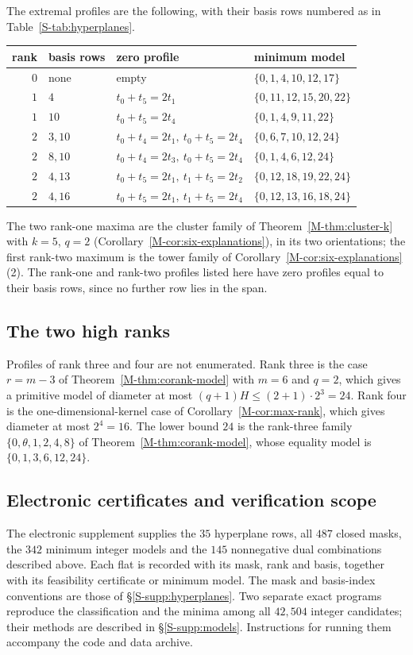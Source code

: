 \documentclass[11pt,reqno]{amsart}
\theoremstyle{plain}
\theoremstyle{definition}
\theoremstyle{plain}
\theoremstyle{plain}
\theoremstyle{plain}
\theoremstyle{plain}
\theoremstyle{plain}
\theoremstyle{plain}
\theoremstyle{definition}
\theoremstyle{definition}
\theoremstyle{definition}
\theoremstyle{plain}
\begin{document}
The extremal profiles are the following, with their basis rows numbered as
in Table~\ref{S-tab:hyperplanes}.
\begin{center}\small
\begin{tabular}{@{}rlll@{}}
\toprule
rank & basis rows & zero profile & minimum model\\
\midrule
$0$ & none & empty & $\{0,1,4,10,12,17\}$\\
$1$ & $4$ & $t_0+t_5=2t_1$ & $\{0,11,12,15,20,22\}$\\
$1$ & $10$ & $t_0+t_5=2t_4$ & $\{0,1,4,9,11,22\}$\\
$2$ & $3,10$ & $t_0+t_4=2t_1,\ t_0+t_5=2t_4$ & $\{0,6,7,10,12,24\}$\\
$2$ & $8,10$ & $t_0+t_4=2t_3,\ t_0+t_5=2t_4$ & $\{0,1,4,6,12,24\}$\\
$2$ & $4,13$ & $t_0+t_5=2t_1,\ t_1+t_5=2t_2$ & $\{0,12,18,19,22,24\}$\\
$2$ & $4,16$ & $t_0+t_5=2t_1,\ t_1+t_5=2t_4$ & $\{0,12,13,16,18,24\}$\\
\bottomrule
\end{tabular}
\end{center}
The two rank-one maxima are the cluster family of Theorem~\ref{M-thm:cluster-k} with $k=5$,
$q=2$ (Corollary~\ref{M-cor:six-explanations}), in its two orientations; the first rank-two maximum is
the tower family of Corollary~\ref{M-cor:six-explanations}(2). The rank-one and rank-two profiles
listed here have zero profiles equal to their basis rows, since no further
row lies in the span.

\subsection{The two high ranks}\label{S-supp:high-ranks}
Profiles of rank three and four are not enumerated. Rank three is the case
$r=m-3$ of Theorem~\ref{M-thm:corank-model} with $m=6$ and $q=2$, which gives a primitive model of
diameter at most $(q+1)H\le(2+1)\cdot2^3=24$. Rank four is the
one-dimensional-kernel case of Corollary~\ref{M-cor:max-rank}, which gives diameter at most
$2^4=16$. The lower bound $24$ is the rank-three family
$\{0,\theta,1,2,4,8\}$ of Theorem~\ref{M-thm:corank-model}, whose equality model is
$\{0,1,3,6,12,24\}$.

\subsection{Electronic certificates and verification scope}
\label{S-supp:package}
The electronic supplement supplies the $35$ hyperplane rows, all $487$
closed masks, the $342$ minimum integer models and the $145$ nonnegative
dual combinations described above. Each flat is recorded with its mask,
rank and basis, together with its feasibility certificate or minimum model.
The mask and basis-index conventions are those of
\S\ref{S-supp:hyperplanes}. Two separate exact programs reproduce the
classification and the minima among all $42{,}504$ integer candidates;
their methods are described in \S\ref{S-supp:models}. Instructions for
running them accompany the code and data archive.
\end{document}
